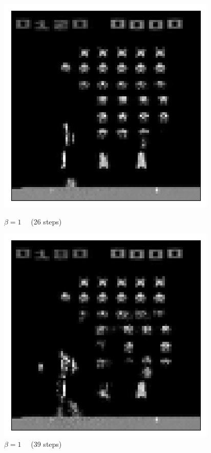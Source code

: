 \begin{figure}[h!]
\begin{multicols}{4}
    \includegraphics[scale=0.4]{figures/results/weighted_average/beta_1_posterior_sample_26.png}
    \caption{$\beta=1\quad$ (26 steps)}
    \includegraphics[scale=0.4]{figures/results/weighted_average/beta_1_posterior_sample_39.png}
    \caption{$\beta=1\quad$ (39 steps)}
\end{multicols}


\end{figure}
